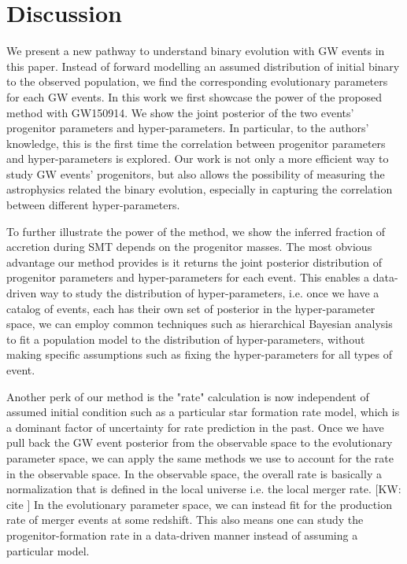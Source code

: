 \documentclass[twocolumn]{aastex631}
\newcommand{\kw}[1]{{\color{rb4}[KW: #1 ]}}
\begin{document}
\section{Discussion}
\label{sec:discussion}


We present a new pathway to understand binary evolution with GW events in this paper.
Instead of forward modelling an assumed distribution of initial binary to the observed population,
we find the corresponding evolutionary parameters for each GW events. 
In this work we first showcase the power of the proposed method with GW150914.
We show the joint posterior of the two events' progenitor parameters and hyper-parameters.
In particular, to the authors' knowledge, this is the first time the correlation between progenitor parameters and hyper-parameters is explored.
Our work is not only a more efficient way to study GW events' progenitors,
but also allows the possibility of measuring the astrophysics related the binary evolution, especially in capturing the correlation between different hyper-parameters.

To further illustrate the power of the method, we show the inferred fraction of accretion during SMT depends on the progenitor masses.
The most obvious advantage our method provides is it returns the joint posterior distribution of progenitor parameters and hyper-parameters for each event.
This enables a data-driven way to study the distribution of hyper-parameters,
i.e. once we have a catalog of events, each has their own set of posterior in the hyper-parameter space,
we can employ common techniques such as hierarchical Bayesian analysis to fit a population model to the distribution of hyper-parameters,
without making specific assumptions such as fixing the hyper-parameters for all types of event.

Another perk of our method is the "rate" calculation is now independent of assumed initial condition such as a particular star formation rate model,
which is a dominant factor of uncertainty for rate prediction in the past.
Once we have pull back the GW event posterior from the observable space to the evolutionary parameter space,
we can apply the same methods we use to account for the rate in the observable space.
In the observable space, the overall rate is basically a normalization that is defined in the local universe i.e. the local merger rate. \kw{cite}
In the evolutionary parameter space, we can instead fit for the production rate of merger events at some redshift.
This also means one can study the progenitor-formation rate in a data-driven manner instead of assuming a particular model.
\end{document}
